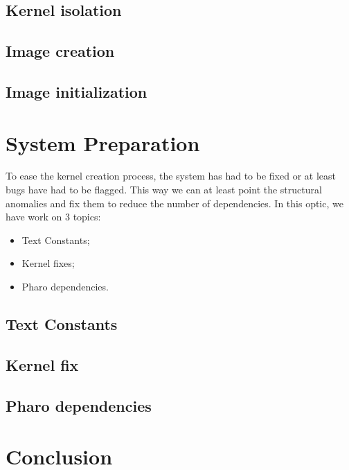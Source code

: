 \documentclass{book}
\begin{document}
	\section{Kernel isolation}\label{KernelIsolation}
	\section{Image creation}
	\section{Image initialization}




\chapter{System Preparation}
To ease the kernel creation process, the system has had to be fixed or at least bugs have had to be flagged. This way we can at least point the structural anomalies and fix them to reduce the number of dependencies. In this optic, we have work on 3 topics:
\begin{itemize}
	\item Text Constants;
	\item Kernel fixes;
	\item Pharo dependencies.
\end{itemize}

	\section{Text Constants}\label{TextConstants}
	\section{Kernel fix}\label{KernelFixes}
	\section{Pharo dependencies}




\chapter{Conclusion}
\end{document}
